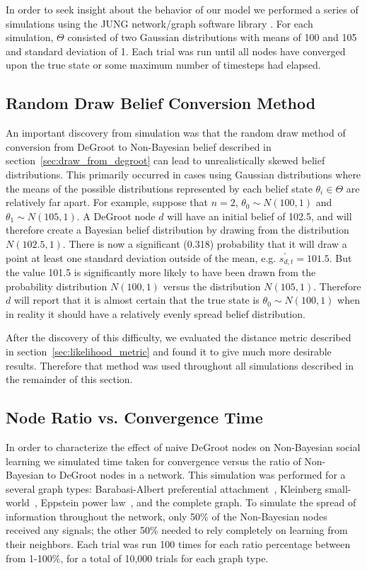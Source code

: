 \documentclass[letterpaper, 11pt, conference]{ieeeconf}
\begin{document}
In order to seek insight about the behavior of our model we performed a series of simulations using the JUNG network/graph software library \cite{website:JUNGGraphLibrary}.  For each simulation, $\Theta$ consisted of two Gaussian distributions with means of 100 and 105 and standard deviation of 1.  Each trial was run until all nodes have converged upon the true state or some maximum number of timesteps had elapsed.

\subsection{Random Draw Belief Conversion Method}

An important discovery from simulation was that the random draw method of conversion from DeGroot to Non-Bayesian belief described in section~\ref{sec:draw_from_degroot} can lead to unrealistically skewed belief distributions.  This primarily occurred in cases using Gaussian distributions where the means of the possible distributions represented by each belief state $\theta_i \in \Theta$ are relatively far apart.  For example, suppose that $n = 2$, $\theta_0 \sim N(100, 1)$ and $\theta_1 \sim N(105, 1)$.  A DeGroot node $d$ will have an initial belief of 102.5, and will therefore create a Bayesian belief distribution by drawing from the distribution $N(102.5, 1)$.  There is now a significant (0.318) probability that it will draw a point at least one standard deviation outside of the mean, e.g. $s_{d,t}^\prime = 101.5$.  But the value 101.5 is significantly more likely to have been drawn from the probability distribution $N(100, 1)$ versus the distribution $N(105, 1)$.  Therefore $d$ will report that it is almost certain that the true state is $\theta_0 \sim N(100, 1)$ when in reality it should have a relatively evenly spread belief distribution.

After the discovery of this difficulty, we evaluated the distance metric described in section~\ref{sec:likelihood_metric} and found it to give much more desirable results.  Therefore that method was used throughout all simulations described in the remainder of this section.

\subsection{Node Ratio vs. Convergence Time}
\label{sec:node_ratio_vs_convergence_time}

In order to characterize the effect of naive DeGroot nodes on Non-Bayesian social learning we simulated time taken for convergence versus the ratio of Non-Bayesian to DeGroot nodes in a network.  This simulation was performed for a several graph types: Barabasi-Albert preferential attachment~\cite{Barabasi}, Kleinberg small-world~\cite{KleinbergSmallWorld}, Eppstein power law~\cite{Eppstein}, and the complete graph.  To simulate the spread of information throughout the network, only 50\% of the Non-Bayesian nodes received any signals; the other 50\% needed to rely completely on learning from their neighbors.  Each trial was run 100 times for each ratio percentage between from 1-100\%, for a total of 10,000 trials for each graph type.
\end{document}
